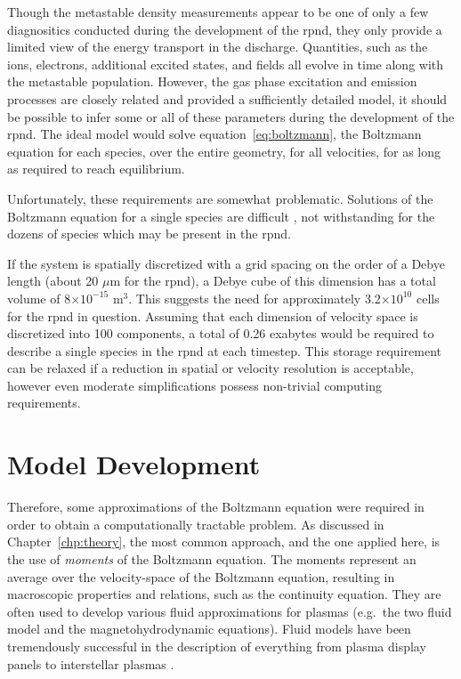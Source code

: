 Though the metastable density measurements appear to be one of only a few
diagnositics conducted during the development of the \acs{rpnd}, they only
provide a limited view of the energy transport in the discharge. Quantities,
such as the ions, electrons, additional excited states, and fields all evolve in
time along with the metastable population. However, the gas phase excitation and
emission processes are closely related and provided a sufficiently detailed
model, it should be possible to infer some or all of these parameters during the
development of the \acs{rpnd}. The ideal model would solve
equation~\ref{eq:boltzmann}, the Boltzmann equation for each species, over the
entire geometry, for all velocities, for as long as required to reach
equilibrium.

Unfortunately, these requirements are somewhat problematic. Solutions of the
Boltzmann equation for a single species are difficult \cite{Lieberman2005}, not
withstanding for the dozens of species which may be present in the \acs{rpnd}.

If the system is spatially discretized with a grid spacing on the order of a
Debye length (about 20 $\mu$m for the \acs{rpnd}), a Debye cube of this
dimension has a total volume of 8$\times10^{-15}$ m$^3$. This suggests the need
for approximately 3.2$\times10^{10}$ cells for the \acs{rpnd} in question.
Assuming that each dimension of velocity space is discretized into 100
components, a total of 0.26 exabytes would be required to describe a single
species in the \acs{rpnd} at each timestep. This storage requirement can be
relaxed if a reduction in spatial or velocity resolution is acceptable, however
even moderate simplifications possess non-trivial computing requirements.

\section{Model Development}

Therefore, some approximations of the Boltzmann equation were required in order
to obtain a computationally tractable problem. As discussed in
Chapter~\ref{chp:theory}, the most common approach, and the one applied here, is
the use of \emph{moments} of the Boltzmann equation. The moments represent an
average over the velocity-space of the Boltzmann equation, resulting in
macroscopic properties and relations, such as the continuity equation. They are
often used to develop various fluid approximations for plasmas \cite{Chen1984}
(e.g.\ the two fluid model and the magnetohydrodynamic equations). Fluid models
have been tremendously successful in the description of everything from plasma
display panels \cite{Rauf1999b} to interstellar plasmas \cite{Linde1998}.

